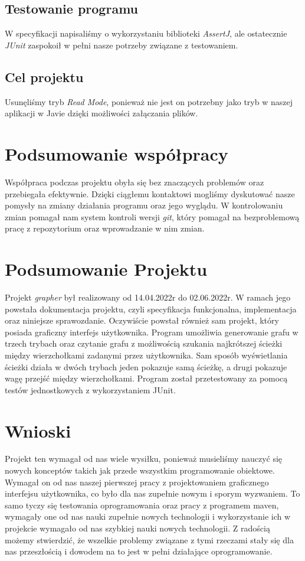 \documentclass[10pt, a4paper]{report}
\begin{document}
\subsection{Testowanie programu}\label{subsec:testowanie-programu}
W specyfikacji napisaliśmy o wykorzystaniu biblioteki \textit{AssertJ}, ale
ostatecznie \textit{JUnit} zaspokoił w pełni nasze potrzeby związane
z testowaniem.

\subsection{Cel projektu}\label{subsec:cel-projektu}
Usunęliśmy tryb \textit{Read Mode}, ponieważ nie jest on potrzebny jako tryb w naszej aplikacji w Javie dzięki możliwości załączania plików.

\section{Podsumowanie współpracy}\label{sec:podsumowanie-współpracy}
Współpraca podczas projektu obyła się bez znaczących problemów oraz przebiegała
efektywnie.
Dzięki ciągłemu kontaktowi mogliśmy dyskutować nasze pomysły na zmiany
działania programu oraz jego wyglądu.
W kontrolowaniu zmian pomagał nam system kontroli wersji \textit{git}, który
pomagał na bezproblemową pracę z repozytorium oraz wprowadzanie w nim zmian.

\section{Podsumowanie Projektu}\label{sec:podsumowanie-projektu}
Projekt \textit{grapher} był realizowany od 14.04.2022r do 02.06.2022r. W
ramach jego powstała dokumentacja projektu, czyli
specyfikacja funkcjonalna, implementacja oraz niniejsze sprawozdanie.
Oczywiście powstał również sam projekt, który posiada graficzny interfejs
użytkownika.
Program umożliwia generowanie grafu w trzech trybach oraz czytanie grafu z
możliwością szukania najkrótszej ścieżki między wierzchołkami zadanymi przez
użytkownika.
Sam sposób wyświetlania ścieżki działa w dwóch trybach jeden pokazuje samą
ścieżkę, a drugi pokazuje wagę przejść między wierzchołkami. Program został
przetestowany za pomocą testów
jednostkowych z wykorzystaniem JUnit.

\section{Wnioski}\label{sec:wnioski}
Projekt ten wymagał od nas wiele wysiłku, ponieważ musieliśmy nauczyć się
nowych konceptów takich jak przede wszystkim
programowanie obiektowe. Wymagał on od nas naszej pierwszej pracy z
projektowaniem graficznego interfejsu użytkownika, co było dla nas zupełnie
nowym i sporym wyzwaniem.
To samo tyczy się testowania oprogramowania oraz pracy z programem maven,
wymagały one od nas nauki zupełnie nowych technologii i wykorzystanie ich w
projekcie wymagało od nas
szybkiej nauki nowych technologii. Z radością możemy stwierdzić, że wszelkie
problemy związane z tymi rzeczami stały się dla nas przeszłością i dowodem na
to jest w pełni działające
oprogramowanie.
\end{document}
